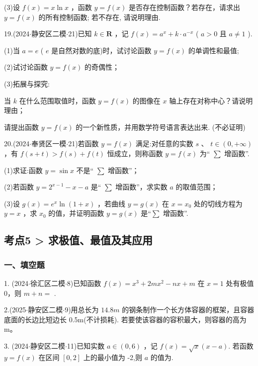 (3)设 $f\left( x\right)  = x\ln x$ ，函数 $y = f\left( x\right)$ 是否存在控制函数？若存在，请求出 $y = f\left( x\right)$ 的所有控制函数; 若不存在, 请说明理由.

19.(2024$\cdot$静安区二模$\cdot$21)已知 $k \in  \mathbf{R}$ ，记 $f\left( x\right)  = {a}^{x} + k \cdot  {a}^{-x}$ ( $a > 0$ 且 $a \neq  1$ ).

(1)当 $a = {e}$ ( ${e}$ 是自然对数的底)时，试讨论函数 $y = f\left( x\right)$ 的单调性和最值;

(2)试讨论函数 $y = f\left( x\right)$ 的奇偶性；

(3)拓展与探究:

   当 $k$ 在什么范围取值时，函数 $y = f\left( x\right)$ 的图像在 $x$ 轴上存在对称中心？请说明理由；

   请提出函数 $y = f\left( x\right)$ 的一个新性质，并用数学符号语言表达出来. (不必证明)

20.(2024$\cdot$奉贤区一模$\cdot$21)若函数 $y = f\left( x\right)$ 满足:对任意的实数 $s$ 、 $t \in  \left( {0, + \infty }\right)$ ，有 $f\left( {s + t}\right)  >  f\left( s\right)  + f\left( t\right)$ 恒成立，则称函数 $y = f\left( x\right)$ 为“ $\sum$ 增函数”.

(1)求证:函数 $y = \sin x$ 不是“ $\sum$ 增函数”；

(2)若函数 $y = {2}^{x - 1} - x - a$ 是“ $\sum$ 增函数”，求实数 $a$ 的取值范围；

(3)设 $g\left( x\right)  = {{e}}^{x}\ln \left( {1 + x}\right)$ ，若曲线 $y = g\left( x\right)$ 在 $x = {x}_{0}$ 处的切线方程为 $y = x$ ，求 ${x}_{0}$ 的值，并证明函数 $y = g\left( x\right)$ 是“$\sum$ 增函数”.

\subsection*{考点5 > 求极值、最值及其应用}

\subsubsection*{一、填空题}

1. (2024$\cdot$徐汇区二模$\cdot$8)已知函数 $f\left( x\right)  = {x}^{3} + {2m}{x}^{2} - {nx} + m$ 在 $x = 1$ 处有极值 0，则 $m + n =$ \blkda[2]{}.

2.(2025$\cdot$静安区二模$\cdot$9)用总长为 ${14.8}{m}$ 的钢条制作一个长方体容器的框架，且容器底面的长边比短边长 0.5m(不计损耗). 若要使该容器的容积最大，则容器的高为\blkda[2]{}m。

3. (2024$\cdot$静安区二模$\cdot$11)已知实数 $a \in  \left( {0,6}\right)$ ，记 $f\left( x\right)  = \sqrt{x}\left( {x - a}\right)$. 若函数 $y = f\left( x\right)$ 在区间 $\left\lbrack  {0,2}\right\rbrack$ 上的最小值为 -2,则 $a$ 的值为\blkda[2]{}.

